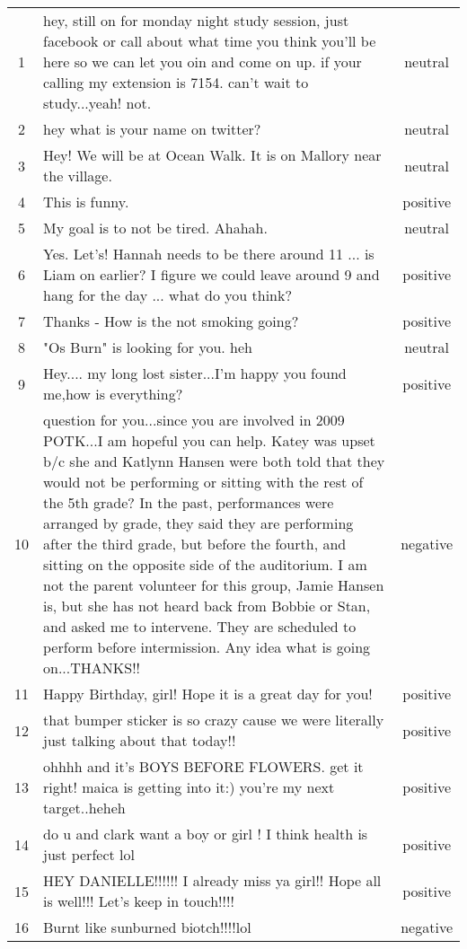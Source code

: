\begin{center}
\begin{footnotesize}
\begin{longtable}{cp{3.8in}c}
1 & hey, still on for monday night study session, just facebook or call about what time you think you'll be here so we can let you oin and come on up. if your calling my extension is 7154. can't wait to study...yeah! not. & neutral\\
2 & hey what is your name on twitter? & neutral\\
3 & Hey!  We will be at Ocean Walk.  It is on Mallory near the village. & neutral\\
4 & This is funny. & positive\\
5 & My goal is to not be tired. Ahahah.   & neutral\\
6 & Yes. Let's! Hannah needs to be there around 11 ... is Liam on earlier? I figure we could leave around 9 and hang for the day ... what do you think? & positive\\
7 & Thanks - How is the not smoking going? & positive\\
8 & "Os Burn" is looking for you.  heh & neutral\\
9 & Hey.... my long lost sister...I'm happy you found me,how is everything? & positive\\
10 & question for you...since you are involved in 2009 POTK...I am hopeful you can help. Katey was upset b/c she and Katlynn Hansen were both told that they would not be performing or sitting with the rest of the 5th grade?  In the past, performances were arranged by grade, they said they are performing after the third grade, but before the fourth, and sitting on the opposite side of the auditorium.  I am not the parent volunteer for this group, Jamie Hansen is, but she has not heard back from Bobbie or Stan, and asked me to intervene.  They are scheduled to perform before intermission. Any idea what is going on...THANKS!! & negative\\
11 & Happy Birthday, girl!  Hope it is a great day for you! & positive\\
12 & that bumper sticker is so crazy cause we were literally just talking about that today!! & positive\\
13 & ohhhh and it's BOYS BEFORE FLOWERS. get it right! maica is getting into it:) you're my next target..heheh & positive\\
14 & do u and clark want a boy or girl ! I think health is just perfect lol & positive\\
15 & HEY DANIELLE!!!!!! I already miss ya girl!! Hope all is well!!! Let's keep in touch!!!! & positive\\
16 & Burnt like sunburned biotch!!!!lol & negative\\

\end{longtable}
\end{footnotesize}
\end{center}
